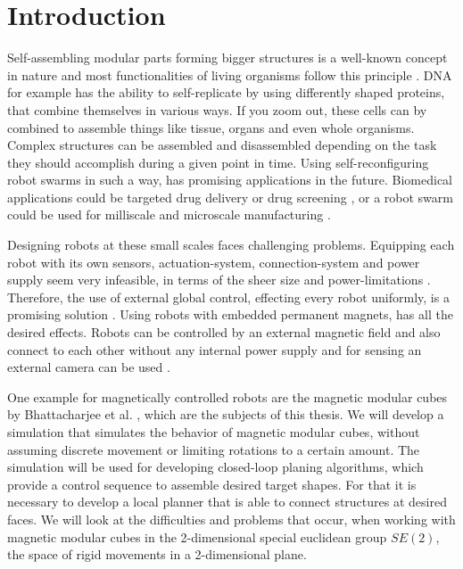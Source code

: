 \chapter{Introduction}

Self-assembling modular parts forming bigger structures is a well-known concept in nature and most functionalities of living organisms follow this principle \cite{bishop2005}.
DNA for example has the ability to self-replicate by using differently shaped proteins, that combine themselves in various ways.
If you zoom out, these cells can by combined to assemble things like tissue, organs and even whole organisms.
Complex structures can be assembled and disassembled depending on the task they should accomplish during a given point in time. 
Using self-reconfiguring robot swarms in such a way, has promising applications in the future.
Biomedical applications could be targeted drug delivery or drug screening \cite{sitti2015}, or a robot swarm could be used for milliscale and microscale manufacturing \cite{pelrine2016}.

Designing robots at these small scales faces challenging problems.
Equipping each robot with its own sensors, actuation-system, connection-system and power supply seem very infeasible, in terms of the sheer size and power-limitations \cite{white2007}.
Therefore, the use of external global control, effecting every robot uniformly, is a promising solution \cite{white2007}.
Using robots with embedded permanent magnets, has all the desired effects.
Robots can be controlled by an external magnetic field and also connect to each other without any internal power supply and for sensing an external camera can be used \cite{saab2019}.

One example for magnetically controlled robots are the magnetic modular cubes by Bhattacharjee et al. \cite{Bhattacharjee2022}, which are the subjects of this thesis.
We will develop a simulation that simulates the behavior of magnetic modular cubes, without assuming discrete movement or limiting rotations to a certain amount.
The simulation will be used for developing closed-loop planing algorithms, which provide a control sequence to assemble desired target shapes.
For that it is necessary to develop a local planner that is able to connect structures at desired faces.
We will look at the difficulties and problems that occur, when working with magnetic modular cubes in the 2-dimensional special euclidean group \(SE(2)\), the space of rigid movements in a 2-dimensional plane.


